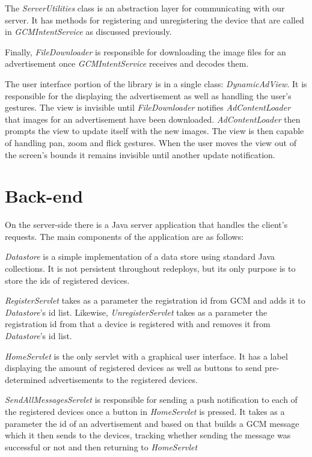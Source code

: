 The \textit{ServerUtilities} class is an abstraction layer for communicating with our server. It has methods for registering and unregistering the device that are called in \textit{GCMIntentService} as discussed previously.

Finally, \textit{FileDownloader} is responsible for downloading the image files for an advertisement once \textit{GCMIntentService} receives and decodes them.

The user interface portion of the library is in a single class: \textit{DynamicAdView}. It is responsible for the displaying the advertisement as well as handling the user's gestures. The view is invisible until \textit{FileDownloader} notifies \textit{AdContentLoader} that images for an advertisement have been downloaded. \textit{AdContentLoader} then prompts the view to update itself with the new images. The view is then capable of handling pan, zoom and flick gestures. When the user moves the view out of the screen's bounds it remains invisible until another update notification.

\section{Back-end}

On the server-side there is a Java server application that handles the client's requests. The main components of the application are as follows:

\textit{Datastore} is a simple implementation of a data store using standard Java collections. It is not persistent throughout redeploys, but its only purpose is to store the ids of registered devices.

\textit{RegisterServlet} takes as a parameter the registration id from GCM and adds it to \textit{Datastore}'s id list. Likewise, \textit{UnregisterServlet} takes as a parameter the registration id from that a device is registered with and removes it from \textit{Datastore}'s id list.

\textit{HomeServlet} is the only servlet with a graphical user interface. It has a label displaying the amount of registered devices as well as buttons to send pre-determined advertisements to the registered devices.

\textit{SendAllMessagesServlet} is responsible for sending a push notification to each of the registered devices once a button in \textit{HomeServlet} is pressed. It takes as a parameter the id of an advertisement and based on that builds a GCM message which it then sends to the devices, tracking whether sending the message was successful or not and then returning to \textit{HomeServlet}

